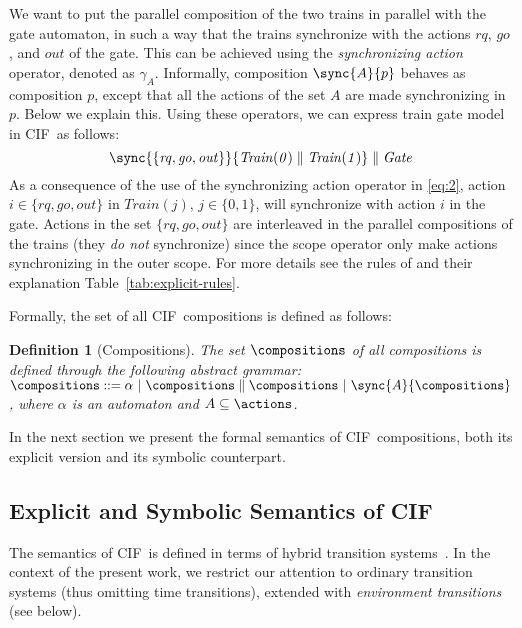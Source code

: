 \documentclass[submission,copyright,creativecommons,sharealike]{eptcs}
\newcommand{\CIF}{{CIF}}
\newcommand{\syncfs}{\ensuremath{\gamma}}
\newtheorem{definition}{Definition}
\begin{document}
We want to put the parallel composition of the two trains in parallel
with the gate automaton, in such a way that the trains synchronize
with the actions $\mathit{rq}$, $\mathit{go}$, and $\mathit{out}$ of
the gate. This can be achieved using the \emph{synchronizing action}
operator, denoted as $\syncfs_A$. Informally, composition
$\sync{A}{p}$ behaves as composition $p$, except that all the actions
of the set $A$ are made synchronizing in $p$. Below we explain this.
Using these operators, we can express train gate model in \CIF\ as follows:
\begin{equation}
  \label{eq:2}
  \sync{\{\mathit{rq}, \mathit{go},
    \mathit{out}\}}{\mathit{Train(0)} \parallel
  \mathit{Train(1)}}\parallel \mathit{Gate}
\end{equation}
As a consequence of the use of the synchronizing action operator in
\eqref{eq:2}, action $i \in \{\mathit{rq}, \mathit{go},
\mathit{out}\}$ in $\mathit{Train(j)}$, $j \in \{0, 1\}$, will
synchronize with action $i$ in the gate. Actions in the set
$\{\mathit{rq}, \mathit{go}, \mathit{out}\}$ are interleaved in the
parallel compositions of the trains (they \emph{do not} synchronize)
since the scope operator only make actions synchronizing in the outer
scope. For more details see the rules of and their explanation
Table~\ref{tab:explicit-rules}.



Formally, the set of all \CIF\ compositions is defined as follows:
\begin{definition}[Compositions]
  The set $\compositions$ of all compositions is defined through the
  following abstract grammar: $\compositions ::= \alpha\ |\
  \compositions \parallel \compositions \ |\ \sync{A}{\compositions}$,
  where $\alpha$ is an automaton and $A \subseteq \actions$.
\end{definition}


In the next section we present the formal semantics of \CIF\ compositions,
both its explicit version and  its symbolic counterpart.

\subsection{Explicit and Symbolic Semantics of \CIF}
\label{sec:expl-symb-semant}

The semantics of \CIF\ is defined in terms of hybrid transition
systems~\cite{CuijpersReniers:LostInTranslation08}.
In the context of the present work, we restrict our attention to
ordinary transition systems (thus omitting time
  transitions), extended with \emph{environment transitions} (see
below).
\end{document}
